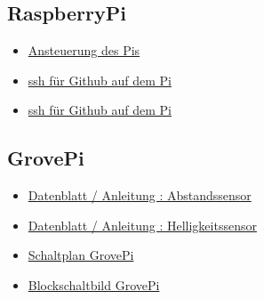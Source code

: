 \documentclass[notitlepage]{report}
\begin{document}
\subsection{RaspberryPi}

\begin{itemize}

\item \href{http://www.netzmafia.de/skripten/hardware/RasPi/RasPi_GPIO_C.html}{Ansteuerung des Pis}

\item \href{https://help.github.com/enterprise/2.14/user/articles/generating-a-new-ssh-key-and-adding-it-to-the-ssh-agent/}{ssh f\"{u}r Github auf dem Pi}

\item \href{https://devmarketer.io/learn/set-ssh-key-github/}{ssh f\"{u}r Github auf dem Pi}

\end{itemize}

\subsection{GrovePi}

\begin{itemize}

\item \href{http://cdn-reichelt.de/documents/datenblatt/A300/GRV_IR_DISTANCE_AL-EN.pdf}{Datenblatt / Anleitung : Abstandssensor}

\item \href{http://www.mouser.com/catalog/specsheets/Seeed_101020022.pdf}{Datenblatt / Anleitung : Helligkeitssensor}

\item \href{https://github.com/DexterInd/GrovePi/blob/master/Hardware/GrovePi%2B%20v3.0.pdf}{Schaltplan GrovePi}

\item \href{https://github.com/DexterInd/GrovePi/blob/master/Hardware/GrovePi%20Graphical%20Datasheet.jpg}{Blockschaltbild GrovePi}

\end{itemize}
\end{document}
